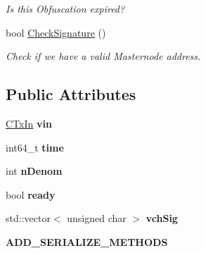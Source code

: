 \begin{DoxyCompactItemize}
\begin{DoxyCompactList}\small\item\em Is this Obfuscation expired? \end{DoxyCompactList}\item 
\mbox{\label{class_c_obfuscation_queue_a2e19fb8d379c1d68e756de04e35b0d7d}} 
bool \mbox{\hyperlink{class_c_obfuscation_queue_a2e19fb8d379c1d68e756de04e35b0d7d}{Check\+Signature}} ()
\begin{DoxyCompactList}\small\item\em Check if we have a valid Masternode address. \end{DoxyCompactList}\end{DoxyCompactItemize}
\subsection*{Public Attributes}
\begin{DoxyCompactItemize}
\item 
\mbox{\label{class_c_obfuscation_queue_ac28047970d64bce5d6d658a66e20ca25}} 
\mbox{\hyperlink{class_c_tx_in}{C\+Tx\+In}} {\bfseries vin}
\item 
\mbox{\label{class_c_obfuscation_queue_a7e6a1b419f2df8da612adf59f5ddd0f9}} 
int64\+\_\+t {\bfseries time}
\item 
\mbox{\label{class_c_obfuscation_queue_a71cfb69b208a7e013c07ca282853edd6}} 
int {\bfseries n\+Denom}
\item 
\mbox{\label{class_c_obfuscation_queue_aab715446f04f6dbc797052b17674841d}} 
bool {\bfseries ready}
\item 
\mbox{\label{class_c_obfuscation_queue_acd54d1bde31b326afd65d0135bbc7779}} 
std\+::vector$<$ unsigned char $>$ {\bfseries vch\+Sig}
\item 
\mbox{\label{class_c_obfuscation_queue_ac7f56ec8591a14bc3382edb1a5ac8653}} 
{\bfseries A\+D\+D\+\_\+\+S\+E\+R\+I\+A\+L\+I\+Z\+E\+\_\+\+M\+E\+T\+H\+O\+DS}
\end{DoxyCompactItemize}


